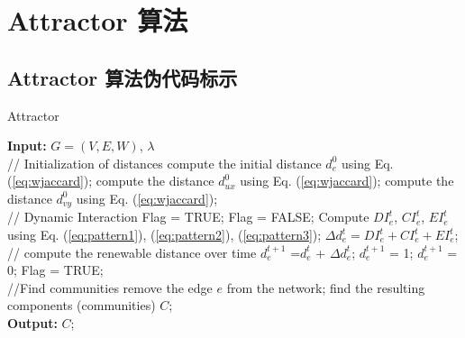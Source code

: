 

\chapter{Attractor 算法}
\section{Attractor 算法伪代码标示}
\label{attractor:code}

\renewcommand{\baselinestretch}{0.9} 

\begin{algorithm}[!tb]
\caption{Attractor}
\begin{algorithmic}[1]
\footnotesize{

\STATE \textbf{Input:} $G = (V,E,W)$, $\lambda$ \\[1ex]
\STATE // Initialization of distances
        \STATE compute the initial distance $d_e^{0}$ using Eq. (\ref{eq:wjaccard});
            \STATE compute the distance $d_{ux}^{0}$ using Eq. (\ref{eq:wjaccard});
        \ENDFOR
            \STATE compute the distance $d_{vy}^{0}$ using Eq. (\ref{eq:wjaccard});
        \ENDFOR
    \ENDFOR\\[1ex]
\STATE // Dynamic Interaction
\STATE Flag = TRUE;
        \STATE Flag = FALSE;
                \STATE Compute $DI_e^t$, $CI_e^t$, $EI_e^t$  using Eq.  (\ref{eq:pattern1}), (\ref{eq:pattern2}),  (\ref{eq:pattern3});
                \STATE $\Delta d_e^t = DI_e^t + CI_e^t +EI_e^t$;
                    \STATE // compute the renewable distance over time
                    \STATE $d_e^{t+1}$ =$d_e^t$ + $\Delta d_e^t$;
                        \STATE $d_e^{t+1}$ = 1;
                    \ENDIF
                        \STATE $d_e^{t+1}$ = 0;
                    \ENDIF
                    \STATE Flag = TRUE;
                \ENDIF
            \ENDIF
        \ENDFOR
 \ENDWHILE\\[1ex]

 \STATE //Find communities
                   \STATE remove the edge $e$ from the network;
            \ENDIF
         \ENDFOR
          \STATE find the resulting components (communities) $C$;\\[1ex]
\STATE \textbf{Output:} $C$;

}
\end{algorithmic}
\end{algorithm}

